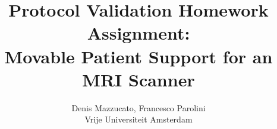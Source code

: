 \documentclass{article}
\begin{document}
\title{Protocol Validation Homework Assignment:\\Movable Patient Support for an MRI Scanner}
\author{Denis Mazzucato, Francesco Parolini\\Vrije Universiteit Amsterdam }
\date{}

\maketitle
\vfill
\tableofcontents
\newpage










\end{document}
